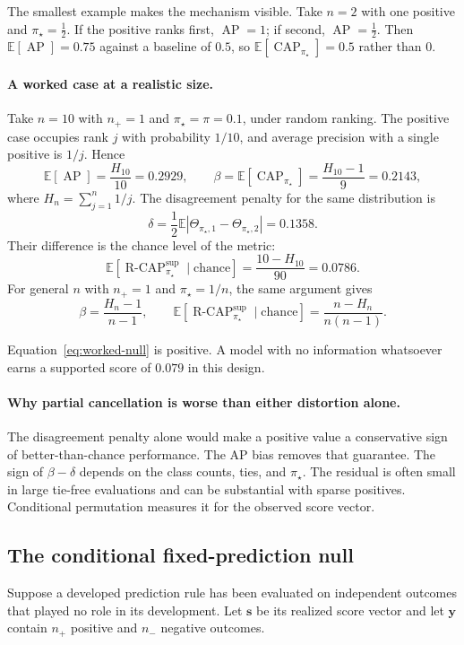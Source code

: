 \documentclass[11pt]{article}
\newcommand{\AP}{\operatorname{AP}}
\newcommand{\CAP}{\operatorname{CAP}}
\newcommand{\Tpi}{\CAP_{\pi_\star}}
\newcommand{\E}{\mathbb{E}}
\newcommand{\RCAP}{\operatorname{R\text{-}CAP}^{\mathrm{sup}}_{\pi_\star}}
\theoremstyle{remark}
\begin{document}
The smallest example makes the mechanism visible. Take $n=2$ with one positive and $\pi_\star=\tfrac12$. If the positive ranks first, $\AP=1$; if second, $\AP=\tfrac12$. Then $\E[\AP]=0.75$ against a baseline of $0.5$, so $\E[\Tpi]=0.5$ rather than $0$.

\paragraph{A worked case at a realistic size.}
Take $n=10$ with $n_+=1$ and $\pi_\star=\pi=0.1$, under random ranking. The positive case occupies rank $j$ with probability $1/10$, and average precision with a single positive is $1/j$. Hence
\[
\E[\AP]=\frac{H_{10}}{10}=0.2929,
\qquad
\beta=\E[\Tpi]=\frac{H_{10}-1}{9}=0.2143,
\]
where $H_{n}=\sum_{j=1}^{n}1/j$. The disagreement penalty for the same distribution is
\[
\delta
=
\frac{1}{2}\E\left|\Theta_{\pi_\star,1}-\Theta_{\pi_\star,2}\right|
=
0.1358 .
\]
Their difference is the chance level of the metric:
\begin{equation}
\E\!\left[\RCAP \mid \text{chance}\right]
=
\frac{10-H_{10}}{90}
=
0.0786 .
\label{eq:worked-null}
\end{equation}
For general $n$ with $n_+=1$ and $\pi_\star=1/n$, the same argument gives
\[
\beta=\frac{H_n-1}{n-1},
\qquad
\E\!\left[\RCAP\mid\text{chance}\right]=\frac{n-H_n}{n(n-1)} .
\]

Equation~\eqref{eq:worked-null} is positive. A model with no information whatsoever earns a supported score of $0.079$ in this design.

\paragraph{Why partial cancellation is worse than either distortion alone.}
The disagreement penalty alone would make a positive value a conservative sign of better-than-chance performance. The AP bias removes that guarantee. The sign of $\beta-\delta$ depends on the class counts, ties, and $\pi_\star$. The residual is often small in large tie-free evaluations and can be substantial with sparse positives. Conditional permutation measures it for the observed score vector.

\subsection{The conditional fixed-prediction null}
\label{sec:conditional-null}

Suppose a developed prediction rule has been evaluated on independent outcomes that played no role in its development. Let $\mathbf{s}$ be its realized score vector and let $\mathbf{y}$ contain $n_+$ positive and $n_-$ negative outcomes.
\end{document}
